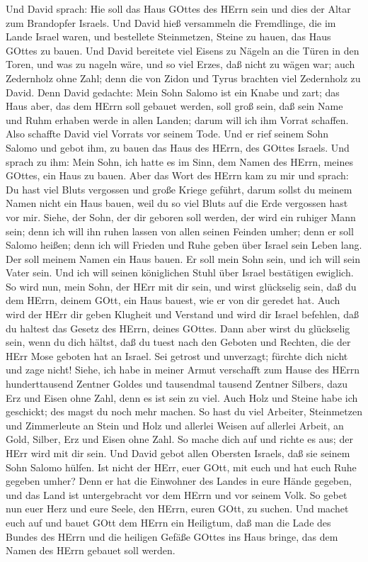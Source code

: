  Und David sprach: Hie soll das Haus GOttes des HErrn sein
und dies der Altar zum Brandopfer Israels.  Und David hieß
versammeln die Fremdlinge, die im Lande Israel waren, und bestellete
Steinmetzen, Steine zu hauen, das Haus GOttes zu bauen.  Und
David bereitete viel Eisens zu Nägeln an die Türen in den Toren, und was
zu nageln wäre, und so viel Erzes, daß nicht zu wägen war; 
auch Zedernholz ohne Zahl; denn die von Zidon und Tyrus brachten viel
Zedernholz zu David.  Denn David gedachte: Mein Sohn Salomo
ist ein Knabe und zart; das Haus aber, das dem HErrn soll gebauet
werden, soll groß sein, daß sein Name und Ruhm erhaben werde in allen
Landen; darum will ich ihm Vorrat schaffen. Also schaffte David viel
Vorrats vor seinem Tode.  Und er rief seinem Sohn Salomo und
gebot ihm, zu bauen das Haus des HErrn, des GOttes Israels. 
Und sprach zu ihm: Mein Sohn, ich hatte es im Sinn, dem Namen des HErrn,
meines GOttes, ein Haus zu bauen.  Aber das Wort des HErrn
kam zu mir und sprach: Du hast viel Bluts vergossen und große Kriege
geführt, darum sollst du meinem Namen nicht ein Haus bauen, weil du so
viel Bluts auf die Erde vergossen hast vor mir.  Siehe, der
Sohn, der dir geboren soll werden, der wird ein ruhiger Mann sein; denn
ich will ihn ruhen lassen von allen seinen Feinden umher; denn er soll
Salomo heißen; denn ich will Frieden und Ruhe geben über Israel sein
Leben lang.  Der soll meinem Namen ein Haus bauen. Er soll
mein Sohn sein, und ich will sein Vater sein. Und ich will seinen
königlichen Stuhl über Israel bestätigen ewiglich.  So wird
nun, mein Sohn, der HErr mit dir sein, und wirst glückselig sein, daß du
dem HErrn, deinem GOtt, ein Haus bauest, wie er von dir geredet hat.
 Auch wird der HErr dir geben Klugheit und Verstand und
wird dir Israel befehlen, daß du haltest das Gesetz des HErrn, deines
GOttes.  Dann aber wirst du glückselig sein, wenn du dich
hältst, daß du tuest nach den Geboten und Rechten, die der HErr Mose
geboten hat an Israel. Sei getrost und unverzagt; fürchte dich nicht und
zage nicht!  Siehe, ich habe in meiner Armut verschafft zum
Hause des HErrn hunderttausend Zentner Goldes und tausendmal tausend
Zentner Silbers, dazu Erz und Eisen ohne Zahl, denn es ist sein zu viel.
Auch Holz und Steine habe ich geschickt; des magst du noch mehr machen.
 So hast du viel Arbeiter, Steinmetzen und Zimmerleute an
Stein und Holz und allerlei Weisen auf allerlei Arbeit,  an
Gold, Silber, Erz und Eisen ohne Zahl. So mache dich auf und richte es
aus; der HErr wird mit dir sein.  Und David gebot allen
Obersten Israels, daß sie seinem Sohn Salomo hülfen.  Ist
nicht der HErr, euer GOtt, mit euch und hat euch Ruhe gegeben umher?
Denn er hat die Einwohner des Landes in eure Hände gegeben, und das Land
ist untergebracht vor dem HErrn und vor seinem Volk.  So
gebet nun euer Herz und eure Seele, den HErrn, euren GOtt, zu suchen.
Und machet euch auf und bauet GOtt dem HErrn ein Heiligtum, daß man die
Lade des Bundes des HErrn und die heiligen Gefäße GOttes ins Haus
bringe, das dem Namen des HErrn gebauet soll werden.

